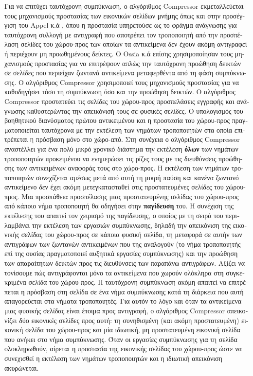 \begin{greek}
Για να επιτύχει ταυτόχρονη συμπύκνωση, ο αλγόριθμος Compressor
εκμεταλλεύεται τους μηχανισμούς προστασίας των εικονικών σελίδων
μνήμης όπως και στην προσέγγιση του Appel κ.ά \cite{DBLP:conf/pldi/AppelEL88},
όπου η προστασία υπηρετούσε ως το φράγμα ανάγνωσης για ταυτόχρονη
συλλογή με αντιγραφή που αποτρέπει τον τροποποιητή από την
προσπέλαση σελίδες του χώρου-προς των οποίων τα αντικείμενα δεν
έχουν ακόμη αντιγραφεί ή περιέχουν μη προωθημένους δείκτες.
O Ossia κ.ά \cite{DBLP:conf/iwmm/OssiaBS04} επίσης χρησιμοποίησαν
τους μηχανισμούς προστασίας για να επιτρέψουν απλώς την ταυτόχρονη
προώθηση δεικτών σε σελίδες που περιείχαν ζωντανά αντικείμενα
μεταφερθέντα από τη φάση συμπύκνωσης. Ο αλγόριθμος Compressor
χρησιμοποιεί τους μηχανισμούς προστασίας για να καθοδηγήσει τόσο
τη συμπύκνωση όσο και την προώθηση δεικτών. Ο αλγόριθμος Compressor
προστατεύει τις σελίδες του χώρου-προς προσπελάσεις εγγραφής
και ανάγνωσης καθυστερώντας την απεικόνισή τους σε φυσικές σελίδες.
Ο υπολογισμός του βοηθητικού διανύσματος πρώτου αντικειμένου
και η προστασία του χώρου-προς πραγματοποιείται ταυτόχρονα
με την εκτέλεση των νημάτων τροποποιητών στα οποία επιτρέπεται
η πρόσβαση μόνο στο χώρο-από. Στη συνέχεια ο αλγόριθμος
Compressor αναστέλλει για ένα πολύ μικρό χρονικό διάστημα την
εκτέλεση \textbf{όλων} των νημάτων τροποποιητών προκειμένου
να ενημερώσει τις ρίζες τους με τις διευθύνσεις προώθησης των
αντικειμένων αναφοράς τους στο χώρο-προς. Η εκτέλεση των νημάτων
τροποποιητών συνεχίζεται αμέσως μετά από αυτή τη μικρή παύση
και κανένα ζωντανό αντικείμενο δεν έχει ακόμη μετεγκατασταθεί
στις προστατευμένες σελίδες του χώρου-προς. Μια προσπάθεια
προσπέλασης μιας προστατευμένης σελίδας του χώρου-προς από
κάποιο νήμα τροποποιητή θα οδηγήσει στην \textbf{παγίδευση}
του. Η συνέχιση της εκτέλεσης του απαιτεί τον χειρισμό της
παγίδευσης, ο οποίος με τη σειρά του περιλαμβάνει την εκτέλεση
των εργασιών συμπύκνωσης, δηλαδή την απεικόνιση της εικονικής
σελίδας του χώρου-προς σε κάποια φυσική σελίδα, τη μεταφορά
σε αυτήν των αντιγράφων των ζωντανών αντικειμένων που της
αναλογούν (το νήμα τροποποιητής επί της ουσίας πραγματοποιεί
αυξητικά εργασίες συμπύκνωσης) και την προώθηση των απαραίτητων
δεικτών προς τις διευθύνσεις των παραπάνω αντιγράφων. Αξίζει
να τονίσουμε πώς αντιγράφονται μόνο τα αντικείμενα που χωρούν
ολόκληρα στη συγκεκριμένα σελίδα του χώρου-προς. Η ταυτόχρονη
συμπύκνωση ακόμη απαιτεί να επιτρέπεται η πρόσβαση στη σελίδα
σε ένα νήμα συμπύκνωσης κατά τη διάρκεια που αυτή απαγορεύεται
στα νήματα τροποποιητές. Για αυτόν το λόγο και όταν τα αντικείμενα
μιας φυσικής σελίδας είναι έτοιμα προς αντιγραφή, ο αλγόριθμος
Compressor απεικονίζει δύο εικονικές σελίδες προς αυτή: τη
συνηθισμένη (και ακόμη προστατευμένη) εικονική σελίδα του χώρου-προς
και μία ιδιωτική, μη προστατευμένη εικονική σελίδα που ανήκει
στο νήμα συμπύκνωσης. Όταν οι εργασίες συμπύκνωσης για τη σελίδα
ολοκληρωθούν, αίρεται η προστασία της εικονικής σελίδας του χώρου-προς
ώστε να συνεχισθεί η εκτέλεση των νημάτων τροποποιητών και η
ιδιωτική απεικόνιση ακυρώνεται.


\end{greek}
